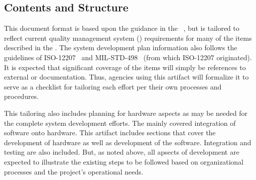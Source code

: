 \subsection{Contents and Structure}
\label{loc:DocOverview_ContentsAndStructure}

This document format is based upon the guidance in the \SDP \DID~\cite{ref__SVD_DID}, but is tailored to reflect current quality management system (\QMS) requirements for many of the items described in the \DID.
The system development plan information also follows the guidelines of ISO-12207~\cite{ref__ISO_12207} and MIL-STD-498~\cite{ref__MIL_STD_498} (from which ISO-12207 originated).
It is expected that significant coverage of the \SDP \DID items will simply be references to external \QMS or \CMMI documentation.
Thus, agencies using this artifact will formalize it to serve as a checklist for tailoring each effort per their own processes and procedures.

This tailoring also includes planning for hardware aspects as may be needed for the complete system development efforts.
The \SDP \DID mainly covered integration of software onto hardware.
This artifact includes sections that cover the development of hardware as well as development of the software.
Integration and testing are also included.
But, as noted above, all apsects of development are expected to illustrate the existing \QMS steps to be followed based on organizational processes and the project's operational needs.

